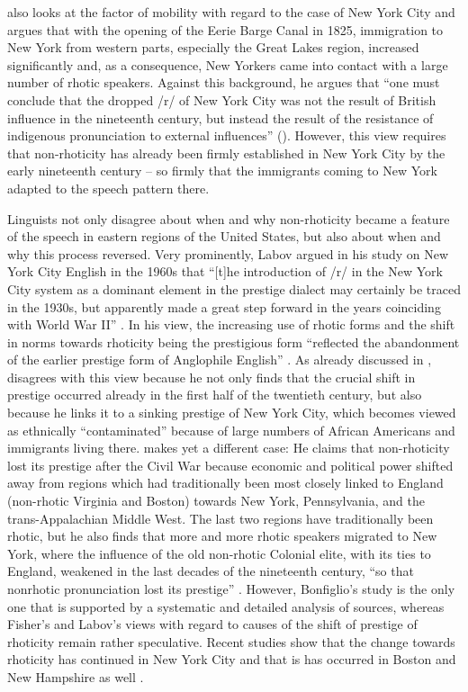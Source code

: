 \citet{Bonfiglio2002} also looks at the factor of mobility with regard to the case of New York City and argues that with the opening of the Eerie Barge Canal in 1825, immigration to New York from western parts, especially the Great Lakes region, increased significantly and, as a consequence, New Yorkers came into contact with a large number of rhotic speakers. Against this background, he argues that “one must conclude that the dropped /r/ of New York City was not the result of British influence in the nineteenth century, but instead the result of the resistance of indigenous pronunciation to external influences” (\citeyear[51]{Bonfiglio2002}). However, this view requires that non-rhoticity has already been firmly established in New York City by the early nineteenth century – so firmly that the immigrants coming to New York adapted to the speech pattern there.

Linguists not only disagree about when and why non-rhoticity became a feature of the speech in eastern regions of the United States, but also about when and why this process reversed. Very prominently, Labov argued in his study on New York City English in the 1960s that “[t]he introduction of /r/ in the New York City system as a dominant element in the prestige dialect may certainly be traced in the 1930s, but apparently made a great step forward in the years coinciding with World War II” \citep[376]{Labov2006}. In his view, the increasing use of rhotic forms and the shift in norms towards rhoticity being the prestigious form “reflected the abandonment of the earlier prestige form of Anglophile English” \citep[296]{Labov2006}. As already discussed in , \citet{Bonfiglio2002} disagrees with this view because he not only finds that the crucial shift in prestige occurred already in the first half of the twentieth century, but also because he links it to a sinking prestige of New York City, which becomes viewed as ethnically “contaminated” because of large numbers of African Americans and immigrants living there. \citet{Fisher2001} makes yet a different case: He claims that non-rhoticity lost its prestige after the Civil War because economic and political power shifted away from regions which had traditionally been most closely linked to England (non-rhotic Virginia and Boston) towards New York, Pennsylvania, and the trans-Appalachian Middle West. The last two regions have traditionally been rhotic, but he also finds that more and more rhotic speakers migrated to New York, where the influence of the old non-rhotic Colonial elite, with its ties to England, weakened in the last decades of the nineteenth century, “so that nonrhotic pronunciation lost its prestige” \citep[77]{Fisher2001}. However, Bonfiglio’s study is the only one that is supported by a systematic and detailed analysis of sources, whereas Fisher’s and Labov’s views with regard to causes of the shift of prestige of rhoticity remain rather speculative. Recent studies show that the change towards rhoticity has continued in New York City \citep{Becker2014} and that is has occurred in Boston and New Hampshire as well \citep{Nagy2010}.

